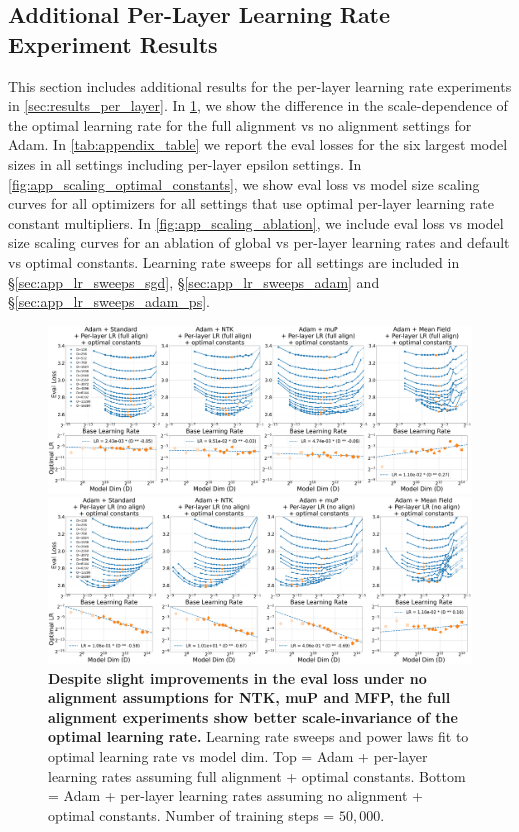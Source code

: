 \documentclass{article}
\newcommand{\sref}[1]{\S\ref{#1}}
\theoremstyle{plain}
\theoremstyle{definition}
\theoremstyle{remark}
\begin{document}
\subsection{Additional Per-Layer Learning Rate Experiment Results}
\label{sec:app_per_layer_lr_results}
This section includes additional results for the per-layer learning rate experiments in \cref{sec:results_per_layer}. In \cref{fig:app_hparam_transfer_align_comparison}, we show the difference in the scale-dependence of the optimal learning rate for the full alignment vs no alignment settings for Adam. In \cref{tab:appendix_table} we report the eval losses for the six largest model sizes in all settings including per-layer epsilon settings. In \cref{fig:app_scaling_optimal_constants}, we show eval loss vs model size scaling curves for all optimizers for all settings that use optimal per-layer learning rate constant multipliers. In \cref{fig:app_scaling_ablation}, we include eval loss vs model size scaling curves for an ablation of global vs per-layer learning rates and default vs optimal constants. Learning rate sweeps for all settings are included in \sref{sec:app_lr_sweeps_sgd}, \sref{sec:app_lr_sweeps_adam} and \sref{sec:app_lr_sweeps_adam_ps}.


\vfill
\begin{figure}[h]
\includegraphics[width=\linewidth]{icml2024/figures/lr_sweeps/appendix/adam/adam+50k_steps_per_module_lr_optimal_constants.pdf}

\figvspace

\includegraphics[width=\linewidth]{icml2024/figures/lr_sweeps/appendix/adam/adam+50k_steps_per_module_lr_optimal_constants_no_align.pdf}
\caption{\textbf{Despite slight improvements in the eval loss under no alignment assumptions for NTK, muP and MFP, the full alignment experiments show better scale-invariance of the optimal learning rate.} Learning rate sweeps and power laws fit to optimal learning rate vs model dim. Top = Adam + per-layer learning rates assuming full alignment + optimal constants. Bottom = Adam + per-layer learning rates assuming no alignment + optimal constants. Number of training steps = $50{,}000$.}
\label{fig:app_hparam_transfer_align_comparison}
\end{figure}
\vfill
\clearpage
\end{document}
